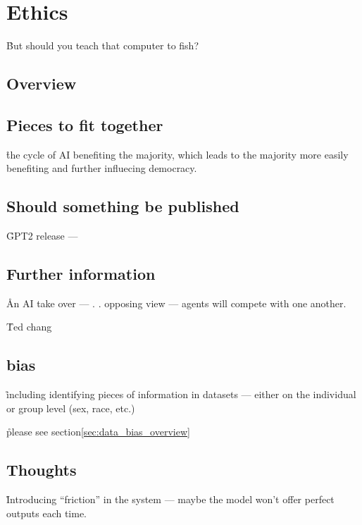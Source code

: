 \chapter{Ethics}

\r{But should you teach that computer to fish?}

\section{Overview}


\section{Pieces to fit together}


\r{the cycle of AI benefiting the majority, which leads to the majority more easily benefiting and further influecing democracy.}

\section{Should something be published}


\r{GPT2 release --- }


\section{Further information}

\r{An AI take over --- . . opposing view --- agents will compete with one another.}

\r{Ted chang}

\section{bias}

\r{including identifying pieces of information in datasets --- either on the individual or group level (sex, race, etc.)}

\r{please see section\ref{sec:data_bias_overview}}


\section{Thoughts}

\r{Introducing ``friction'' in the system --- maybe the model won't offer perfect outputs each time.}